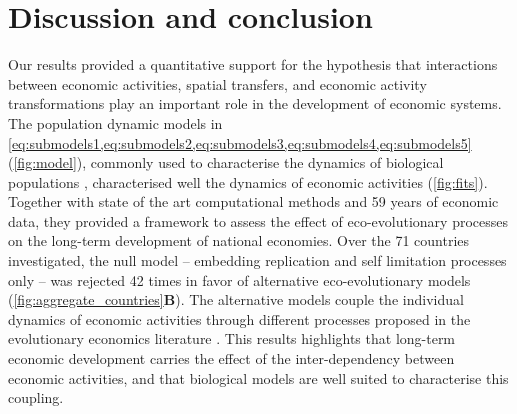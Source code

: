 \section{Discussion and conclusion}

Our results provided a quantitative support for the hypothesis that interactions between economic activities, spatial transfers, and economic activity transformations play an important role in the development of economic systems. 
% 
The population dynamic models in \cref{eq:submodels1,eq:submodels2,eq:submodels3,eq:submodels4,eq:submodels5} (\cref{fig:model}), commonly used to characterise the dynamics of biological populations \cite{Bunin2017,Scheffer2006a,Case1990,Tilman1994b,eigen1988molecular}, characterised well the dynamics of economic activities (\cref{fig:fits}). Together with state of the art computational methods and 59 years of economic data, they provided a framework to assess the effect of eco-evolutionary processes on the long-term development of national economies.
% 
Over the 71 countries investigated, the null model -- embedding replication and self limitation processes only -- was rejected 42 times in favor of alternative eco-evolutionary models (\cref{fig:aggregate_countries}\textbf{B}). The alternative models couple the individual dynamics of economic activities through different processes proposed in the evolutionary economics literature \cite{Hodgson2019}. This results highlights that long-term economic development carries the effect of the inter-dependency between economic activities, and that biological models are well suited to characterise this coupling. %

